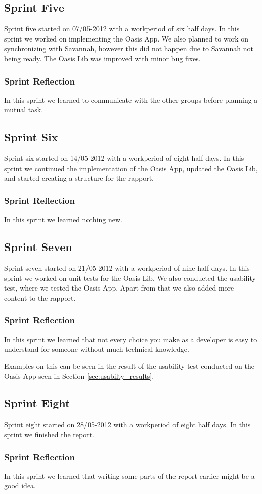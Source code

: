 \subsection{Sprint Five}
Sprint five started on 07/05-2012 with a workperiod of six half days.
In this sprint we worked on implementing the Oasis App.
We also planned to work on synchronizing with Savannah, however this did not happen due to Savannah not being ready.
The Oasis Lib was improved with minor bug fixes.

\subsubsection{Sprint Reflection}
In this sprint we learned to communicate with the other groups before planning a mutual task.

\subsection{Sprint Six}
Sprint six started on 14/05-2012 with a workperiod of eight half days. In this sprint we continued the implementation of the Oasis App, updated the Oasis Lib, and started creating a structure for the rapport.

\subsubsection{Sprint Reflection}
In this sprint we learned nothing new.

\subsection{Sprint Seven}
Sprint seven started on 21/05-2012 with a workperiod of nine half days.
In this sprint we worked on unit tests for the Oasis Lib.
We also conducted the usability test, where we tested the Oasis App.
Apart from that we also added more content to the rapport.

\subsubsection{Sprint Reflection}
In this sprint we learned that not every choice you make as a developer is easy to understand for someone without much technical knowledge.

Examples on this can be seen in the result of the usability test conducted on the Oasis App seen in Section \vref{sec:usabilty_results}.

\subsection{Sprint Eight}
Sprint eight started on 28/05-2012 with a workperiod of eight half days. In this sprint we finished the report.

\subsubsection{Sprint Reflection}
In this sprint we learned that writing some parts of the report earlier might be a good idea.